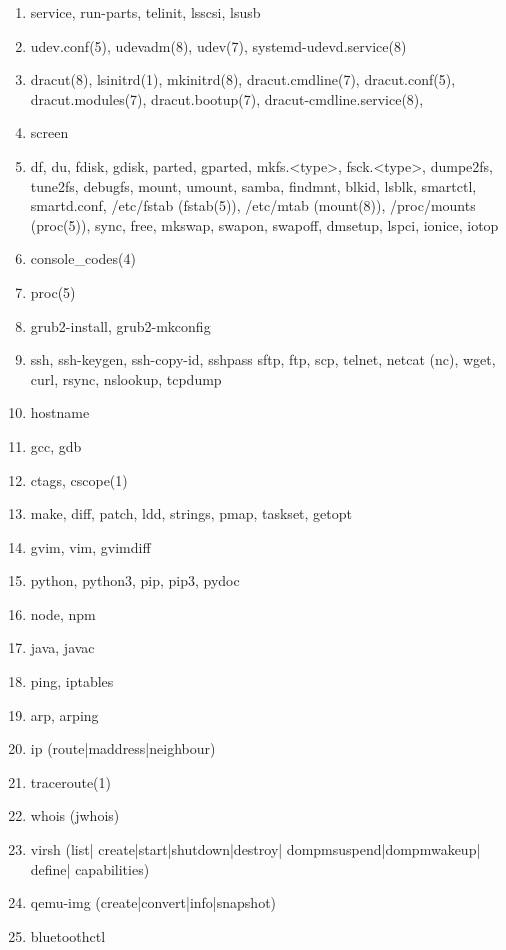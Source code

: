 \documentclass{article}
\begin{document}
\begin{enumerate}
\begin{enumerate}
            \item service, run-parts, telinit, lsscsi, lsusb
            \item udev.conf(5), udevadm(8), udev(7), systemd-udevd.service(8)
            \item dracut(8), lsinitrd(1), mkinitrd(8), dracut.cmdline(7), dracut.conf(5), dracut.modules(7), dracut.bootup(7), dracut-cmdline.service(8),
            \item screen
            \item df, du, fdisk, gdisk, parted, gparted, mkfs.<type>, fsck.<type>, dumpe2fs, tune2fs, debugfs, mount, umount, samba, findmnt, blkid, lsblk, smartctl, smartd.conf, /etc/fstab (fstab(5)), /etc/mtab (mount(8)), /proc/mounts (proc(5)), sync, free, mkswap, swapon, swapoff, dmsetup, lspci, ionice, iotop
            \item console_codes(4)
            \item proc(5)
            \item grub2-install, grub2-mkconfig
            \item ssh, ssh-keygen, ssh-copy-id, sshpass sftp, ftp, scp, telnet, netcat (nc), wget, curl, rsync, nslookup, tcpdump
            \item hostname
            \item gcc, gdb
            \item ctags, cscope(1)
            \item make, diff, patch, ldd, strings, pmap, taskset, getopt
            \item gvim, vim, gvimdiff
            \item python, python3, pip, pip3, pydoc
            \item node, npm
            \item java, javac
            \item ping, iptables
            \item arp, arping
            \item ip (route|maddress|neighbour)
            \item traceroute(1)
            \item whois (jwhois)
            \item virsh (list|
                       create|start|shutdown|destroy|
                       dompmsuspend|dompmwakeup|
                       define|
                       capabilities)
            \item qemu-img (create|convert|info|snapshot)
            \item bluetoothctl

\end{enumerate}
\end{enumerate}
\end{document}
